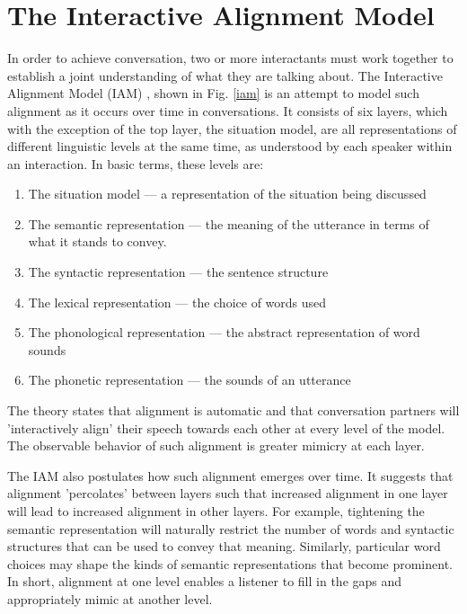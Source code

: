 \documentclass[conference]{IEEEtran}
\begin{document}
\section{The Interactive Alignment Model}
In order to achieve conversation, two or more interactants must work together to establish a joint understanding of what they are talking about. The Interactive Alignment Model (IAM) \cite{pickering2004toward, garrod2004conversation}, shown in Fig. \ref{iam} is an attempt to model such alignment as it occurs over time in conversations. It consists of six layers, which with the exception of the top layer, the situation model, are all representations of different linguistic levels at the same time, as understood by each speaker within an interaction. In basic terms, these levels are:

\begin{enumerate}
	\item The situation model --- a representation of the situation being discussed
	\item The semantic representation --- the meaning of the utterance in terms of what it stands to convey.
	\item The syntactic representation --- the sentence structure
	\item The lexical representation --- the choice of words used
	\item The phonological representation --- the abstract representation of word sounds
	\item The phonetic representation --- the sounds of an utterance
\end{enumerate}

The theory states that alignment is automatic and that conversation partners will 'interactively align' their speech  towards each other at every level of the model. The observable behavior of such alignment is greater mimicry at each layer.

The IAM also postulates how such alignment emerges over time. It suggests that alignment 'percolates' between layers such that increased alignment in one layer will lead to increased alignment in other layers. For example, tightening the semantic representation will naturally restrict the number of words and syntactic structures that can be used to convey that meaning. Similarly, particular word choices may shape the kinds of semantic representations that become prominent. In short, alignment at one level enables a listener to fill in the gaps and appropriately mimic at another level.
\end{document}
